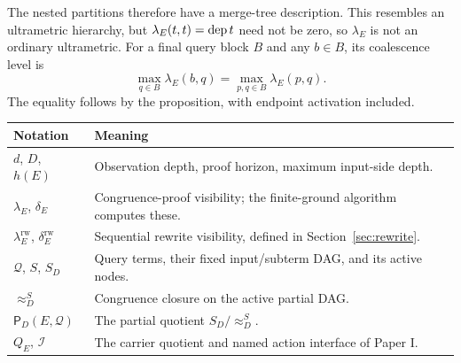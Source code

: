 The nested partitions therefore have a merge-tree description. This
resembles an ultrametric hierarchy, but $\lambda_E(t,t)=\operatorname{dep} t$ need
not be zero, so $\lambda_E$ is not an ordinary ultrametric. For a final
query block $B$ and any $b\in B$, its coalescence level is
\[
\max_{q\in B}\lambda_E(b,q)
=\max_{p,q\in B}\lambda_E(p,q).
\]
The equality follows by the proposition, with endpoint activation included.

\begin{center}
\begin{tabularx}{\textwidth}{@{}lX@{}}
\toprule
Notation & Meaning \\
\midrule
$d$, $D$, $h(E)$ & Observation depth, proof horizon, maximum input-side depth.\\
$\lambda_E$, $\delta_E$ & Congruence-proof visibility; the finite-ground algorithm computes these.\\
$\lambda_E^{\mathrm{rw}}$, $\delta_E^{\mathrm{rw}}$ & Sequential rewrite visibility, defined in Section~\ref{sec:rewrite}.\\
$\mathcal Q$, $S$, $S_D$ & Query terms, their fixed input/subterm DAG, and its active nodes.\\
$\approx_D^S$ & Congruence closure on the active partial DAG.\\
$\mathsf P_D(E,\mathcal Q)$ & The partial quotient $S_D/\approx_D^S$.\\
$Q_E$, $\mathcal I$ & The carrier quotient and named action interface of Paper I.\\
\bottomrule
\end{tabularx}
\end{center}
